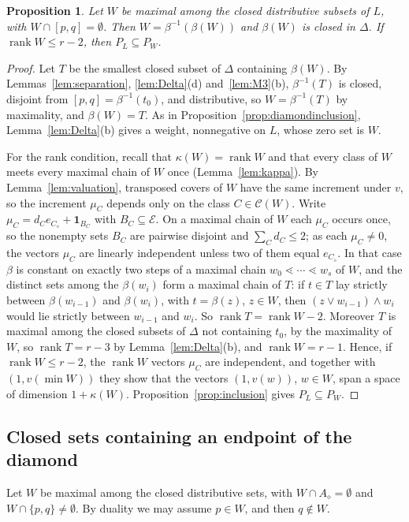 \documentclass{amsart}
\newtheorem{proposition}[theorem]{Proposition}
\theoremstyle{definition}
\DeclareMathOperator{\rk}{rank}
\newcommand{\cC}{\mathcal C}
\newcommand{\cE}{\mathcal E}
\newcommand{\one}{\mathbf 1}
\newcommand{\dm}{\diamond}
\begin{document}
\begin{proposition}\label{prop:avoid}
Let $W$ be maximal among the closed distributive subsets of $L$, with $W\cap[p,q]=\emptyset$. Then $W=\beta^{-1}(\beta(W))$ and $\beta(W)$ is closed in $\Delta$. If $\rk W\le r-2$, then $P_L\subseteq P_W$.
\end{proposition}

\begin{proof}
Let $T$ be the smallest closed subset of $\Delta$ containing $\beta(W)$. By Lemmas~\ref{lem:separation}, \ref{lem:Delta}(d) and~\ref{lem:M3}(b), $\beta^{-1}(T)$ is closed, disjoint from $[p,q]=\beta^{-1}(t_0)$, and distributive, so $W=\beta^{-1}(T)$ by maximality, and $\beta(W)=T$. As in Proposition~\ref{prop:diamondinclusion}, Lemma~\ref{lem:Delta}(b) gives a weight, nonnegative on $L$, whose zero set is $W$.

For the rank condition, recall that $\kappa(W)=\rk W$ and that every class of $W$ meets every maximal chain of $W$ once (Lemma~\ref{lem:kappa}). By Lemma~\ref{lem:valuation}, transposed covers of $W$ have the same increment under $v$, so the increment $\mu_C$ depends only on the class $C\in\cC(W)$. Write $\mu_C=d_Ce_{C_\dm}+\one_{B_C}$ with $B_C\subseteq\cE$. On a maximal chain of $W$ each $\mu_C$ occurs once, so the nonempty sets $B_C$ are pairwise disjoint and $\sum_Cd_C\le2$; as each $\mu_C\ne0$, the vectors $\mu_C$ are linearly independent unless two of them equal $e_{C_\dm}$. In that case $\beta$ is constant on exactly two steps of a maximal chain $w_0\lessdot\cdots\lessdot w_s$ of $W$, and the distinct sets among the $\beta(w_i)$ form a maximal chain of $T$: if $t\in T$ lay strictly between $\beta(w_{i-1})$ and $\beta(w_i)$, with $t=\beta(z)$, $z\in W$, then $(z\vee w_{i-1})\wedge w_i$ would lie strictly between $w_{i-1}$ and $w_i$. So $\rk T=\rk W-2$. Moreover $T$ is maximal among the closed subsets of $\Delta$ not containing $t_0$, by the maximality of $W$, so $\rk T=r-3$ by Lemma~\ref{lem:Delta}(b), and $\rk W=r-1$. Hence, if $\rk W\le r-2$, the $\rk W$ vectors $\mu_C$ are independent, and together with $(1,v(\min W))$ they show that the vectors $(1,v(w))$, $w\in W$, span a space of dimension $1+\kappa(W)$. Proposition~\ref{prop:inclusion} gives $P_L\subseteq P_W$.
\end{proof}

\subsection{Closed sets containing an endpoint of the diamond}
Let $W$ be maximal among the closed distributive sets, with $W\cap A_\dm=\emptyset$ and $W\cap\{p,q\}\ne\emptyset$. By duality we may assume $p\in W$, and then $q\notin W$.
\end{document}
